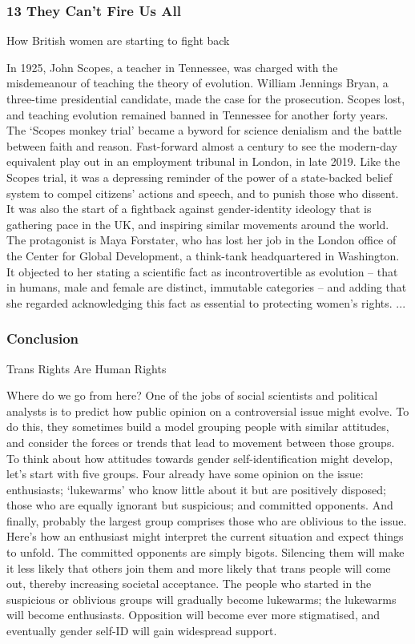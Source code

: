 \documentclass[10pt,titlepage]{book}
\begin{document}
\subsubsection{13 They Can’t Fire Us All}

How British women are starting to fight back

In 1925, John Scopes, a teacher in Tennessee, was charged with the misdemeanour of teaching the theory of evolution. William Jennings Bryan, a three-time presidential candidate, made the case for the prosecution. Scopes lost, and teaching evolution remained banned in Tennessee for another forty years. The ‘Scopes monkey trial’ became a byword for science denialism and the battle between faith and reason. Fast-forward almost a century to see the modern-day equivalent play out in an employment tribunal in London, in late 2019. Like the Scopes trial, it was a depressing reminder of the power of a state-backed belief system to compel citizens’ actions and speech, and to punish those who dissent. It was also the start of a fightback against gender-identity ideology that is gathering pace in the UK, and inspiring similar movements around the world. The protagonist is Maya Forstater, who has lost her job in the London office of the Center for Global Development, a think-tank headquartered in Washington. It objected to her stating a scientific fact as incontrovertible as evolution – that in humans, male and female are distinct, immutable categories – and adding that she regarded acknowledging this fact as essential to protecting women’s rights.
...

\subsubsection{Conclusion}

Trans Rights Are Human Rights

Where do we go from here? One of the jobs of social scientists and political analysts is to predict how public opinion on a controversial issue might evolve. To do this, they sometimes build a model grouping people with similar attitudes, and consider the forces or trends that lead to movement between those groups. To think about how attitudes towards gender self-identification might develop, let’s start with five groups. Four already have some opinion on the issue: enthusiasts; ‘lukewarms’ who know little about it but are positively disposed; those who are equally ignorant but suspicious; and committed opponents. And finally, probably the largest group comprises those who are oblivious to the issue. Here’s how an enthusiast might interpret the current situation and expect things to unfold. The committed opponents are simply bigots. Silencing them will make it less likely that others join them and more likely that trans people will come out, thereby increasing societal acceptance. The people who started in the suspicious or oblivious groups will gradually become lukewarms; the lukewarms will become enthusiasts. Opposition will become ever more stigmatised, and eventually gender self-ID will gain widespread support.
\end{document}
